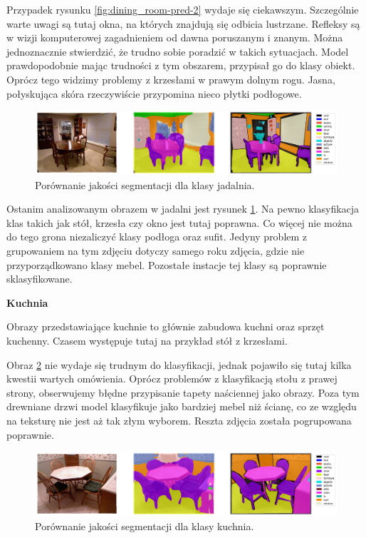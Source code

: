 Przypadek rysunku \ref{fig:dining_room-pred-2} wydaje się ciekawszym. Szczególnie warte uwagi są tutaj okna, na których znajdują się odbicia lustrzane. Refleksy są w wizji komputerowej zagadnieniem od dawna poruszanym i znanym. Można jednoznacznie stwierdzić, że trudno sobie poradzić w takich sytuacjach. Model prawdopodobnie mając trudności z tym obszarem, przypisał go do klasy obiekt. Oprócz tego widzimy problemy z krzesłami w prawym dolnym rogu. Jasna, połyskująca skóra rzeczywiście przypomina nieco płytki podłogowe.


\begin{figure}[ht!]
    \centering
    \includegraphics[width=\textwidth]{img/preds_analysis/gt_vs_pred/dining_room-3.png}
    \caption{Porównanie jakości segmentacji dla klasy jadalnia.}
    \label{fig:dining_room-pred-3}
\end{figure}
Ostanim analizowanym obrazem w jadalni jest rysunek \ref{fig:dining_room-pred-3}. Na pewno klasyfikacja klas takich jak stół, krzesła czy okno jest tutaj poprawna. Co więcej nie można do tego grona niezaliczyć klasy podłoga oraz sufit. Jedyny problem z grupowaniem na tym zdjęciu dotyczy samego roku zdjęcia, gdzie nie przyporządkowano klasy mebel. Pozostałe instacje tej klasy są poprawnie sklasyfikowane.


\noindent
\textbf{Kuchnia}

Obrazy przedstawiające kuchnie to głównie zabudowa kuchni oraz sprzęt kuchenny. Czasem występuje tutaj na przykład stół z krzesłami.

Obraz \ref{fig:kitchen-pred-1} nie wydaje się trudnym do klasyfikacji, jednak pojawiło się tutaj kilka kwestii wartych omówienia. Oprócz problemów z klasyfikacją stołu z prawej strony, obserwujemy błędne przypisanie tapety naściennej jako obrazy. Poza tym drewniane drzwi model klasyfikuje jako bardziej mebel niż ścianę, co ze względu na teksturę nie jest aż tak złym wyborem. Reszta zdjęcia została pogrupowana poprawnie.

\begin{figure}[ht!]
    \centering
    \includegraphics[width=\textwidth]{img/preds_analysis/gt_vs_pred/kitchen-1.png}
    \caption{Porównanie jakości segmentacji dla klasy kuchnia.}
    \label{fig:kitchen-pred-1}
\end{figure}

